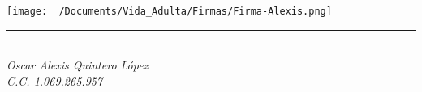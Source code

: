 \vspace*{\fill} %
\noindent
\begin{flushright}
    \texttt{[image: ~/Documents/Vida\_Adulta/Firmas/Firma-Alexis.png]}\\[-1ex]
    \vspace*{-0.6cm} %
    \rule{4.5cm}{1pt}\\
    \textit{Oscar Alexis Quintero López}\\
    \textit{C.C. 1.069.265.957}%
    \vspace*{4mm}
\end{flushright}